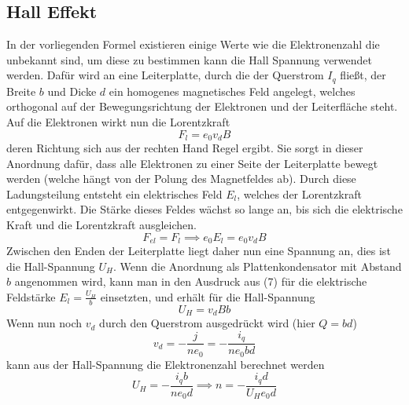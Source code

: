 \subsection{Hall Effekt}
In der vorliegenden Formel existieren einige Werte wie die Elektronenzahl die unbekannt sind, um diese zu bestimmen kann die Hall Spannung verwendet werden. Dafür wird an eine Leiterplatte, durch die der Querstrom $I_q$ fließt, der Breite $b$ und Dicke $d$ ein homogenes magnetisches Feld angelegt, welches orthogonal auf der Bewegungsrichtung der Elektronen und der Leiterfläche steht. Auf die Elektronen wirkt nun die Lorentzkraft
\begin{equation*}
F_l=e_0v_dB
\end{equation*}
deren Richtung sich aus der rechten Hand Regel ergibt. Sie sorgt in dieser Anordnung dafür, dass alle Elektronen zu einer Seite der Leiterplatte bewegt werden (welche hängt von der Polung des Magnetfeldes ab). Durch diese Ladungsteilung entsteht ein elektrisches Feld $E_l$, welches der Lorentzkraft entgegenwirkt. Die Stärke dieses Feldes wächst so lange an, bis sich die elektrische Kraft und die Lorentzkraft ausgleichen.
\begin{equation}
F_{el}=F_l \implies   e_0E_l=e_0v_dB
\end{equation}
Zwischen den Enden der Leiterplatte liegt daher nun eine Spannung an, dies ist die Hall-Spannung $U_H$. Wenn die Anordnung als Plattenkondensator mit Abstand $b$ angenommen wird, kann man in den Ausdruck aus (7) für die elektrische Feldstärke $E_l=\frac{U_H}{b}$ einsetzten, und erhält für die Hall-Spannung
\begin{equation}
U_H=v_dBb
\end{equation}
Wenn nun noch $v_d$ durch den Querstrom ausgedrückt wird (hier $Q=bd$)
\begin{equation}
v_d=-\frac{j}{ne_0}=-\frac{i_q}{ne_0bd}
\end{equation}
kann aus der Hall-Spannung die Elektronenzahl berechnet werden
\begin{equation}
U_H=-\frac{i_qb}{ne_0d} \implies n=-\frac{i_qd}{U_He_0d}
\end{equation}
